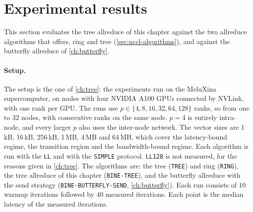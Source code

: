 \section{Experimental results}\label{sec:tar-results}
\renewcommand{\floatpagefraction}{0.95}
This section evaluates the \bine{} tree allreduce of this chapter against the two allreduce algorithms that \nccl{} offers, ring and tree (\cref{sec:nccl-algorithms}), and against the \bine{} butterfly allreduce of \cref{ch:butterfly}.
\paragraph{Setup.}
The setup is the one of \cref{ch:tree}: the experiments run on the MeluXina supercomputer, on nodes with four NVIDIA A100 GPUs connected by NVLink, with one rank per GPU.
The runs use $p\in\{4,8,16,32,64,128\}$ ranks, so from one to $32$ nodes, with consecutive ranks on the same node. $p=4$ is entirely intra-node, and every larger $p$ also uses the inter-node network.
The vector sizes are 1\,kB, 16\,kB, 256\,kB, 1\,MB, 4\,MB and 64\,MB, which cover the latency-bound regime, the transition region and the bandwidth-bound regime.
Each algorithm is run with the \texttt{LL} and with the \texttt{SIMPLE} protocol. \texttt{LL128} is not measured, for the reasons given in \cref{ch:tree}.
The algorithms are: the \nccl{} tree (\texttt{TREE}) and ring (\texttt{RING}), the \bine{} tree allreduce of this chapter (\texttt{BINE-TREE}), and the \bine{} butterfly allreduce with the send strategy (\texttt{BINE-BUTTERFLY-SEND}, \cref{ch:butterfly}).
Each run consists of $10$ warmup iterations followed by $40$ measured iterations.
Each point is the median latency of the measured iterations.
